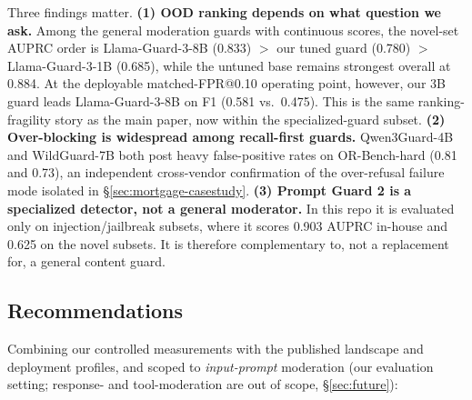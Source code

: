 Three findings matter. \textbf{(1) OOD ranking depends on what question we ask.} Among the general moderation guards with continuous scores, the novel-set AUPRC order is Llama-Guard-3-8B (0.833) $>$ our tuned guard (0.780) $>$ Llama-Guard-3-1B (0.685), while the untuned base remains strongest overall at 0.884. At the deployable matched-FPR@0.10 operating point, however, our 3B guard leads Llama-Guard-3-8B on F1 (0.581 vs.\ 0.475). This is the same ranking-fragility story as the main paper, now within the specialized-guard subset. \textbf{(2) Over-blocking is widespread among recall-first guards.} Qwen3Guard-4B and WildGuard-7B both post heavy false-positive rates on OR-Bench-hard (0.81 and 0.73), an independent cross-vendor confirmation of the over-refusal failure mode isolated in \S\ref{sec:mortgage-casestudy}. \textbf{(3) Prompt Guard 2 is a specialized detector, not a general moderator.} In this repo it is evaluated only on injection/jailbreak subsets, where it scores 0.903 AUPRC in-house and 0.625 on the novel subsets. It is therefore complementary to, not a replacement for, a general content guard.

\subsection{Recommendations}
\label{sec:recommendations}

Combining our controlled measurements with the published landscape and deployment profiles, and scoped to \emph{input-prompt} moderation (our evaluation setting; response- and tool-moderation are out of scope, \S\ref{sec:future}):

